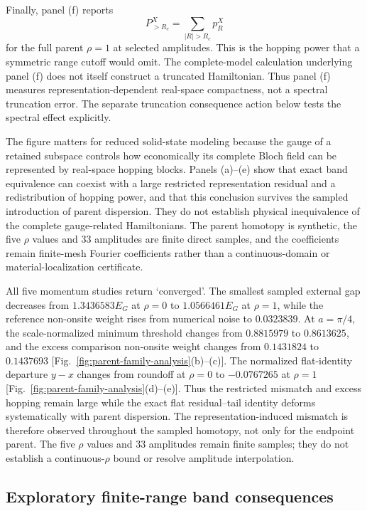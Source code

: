 \documentclass[11pt]{article}
\begin{document}
Finally, panel (f) reports
\begin{equation}
 P_{>R_c}^{X}=\sum_{|R|>R_c}p_R^X
 \label{eq:implemented-cumulative-tail}
\end{equation}
for the full parent $\rho=1$ at selected amplitudes. This is the hopping power that a
symmetric range cutoff would omit. The complete-model calculation underlying panel (f)
does not itself construct a truncated Hamiltonian. Thus panel (f) measures
representation-dependent real-space compactness, not a spectral truncation error. The
separate truncation consequence action below tests the spectral effect explicitly.

The figure matters for reduced solid-state modeling because the gauge of a retained
subspace controls how economically its complete Bloch field can be represented by
real-space hopping blocks. Panels (a)--(e) show that exact band equivalence can coexist
with a large restricted representation residual and a redistribution of hopping power,
and that this conclusion survives the sampled introduction of parent dispersion. They
do not establish physical inequivalence of the complete gauge-related Hamiltonians. The
parent homotopy is synthetic, the five $\rho$ values and 33 amplitudes are finite direct
samples, and the coefficients remain finite-mesh Fourier coefficients rather than a
continuous-domain or material-localization certificate.

All five momentum studies return `converged'. The smallest sampled external gap decreases
from $1.3436583E_G$ at $\rho=0$ to $1.0566461E_G$ at $\rho=1$, while the reference
non-onsite weight rises from numerical noise to $0.0323839$. At $a=\pi/4$, the
scale-normalized minimum threshold changes from $0.8815979$ to $0.8613625$, and the
excess comparison non-onsite weight changes from $0.1431824$ to $0.1437693$
[Fig.~\ref{fig:parent-family-analysis}(b)--(c)]. The normalized flat-identity departure
$y-x$ changes from roundoff at $\rho=0$ to $-0.0767265$ at $\rho=1$
[Fig.~\ref{fig:parent-family-analysis}(d)--(e)]. Thus the restricted mismatch and excess
hopping remain large while the exact flat residual--tail identity deforms systematically
with parent dispersion. The representation-induced mismatch is therefore observed
throughout the sampled homotopy, not only for the endpoint parent.
The five $\rho$ values and 33 amplitudes remain finite samples; they do not establish a
continuous-$\rho$ bound or resolve amplitude interpolation.

\subsection{Exploratory finite-range band consequences}
\end{document}
